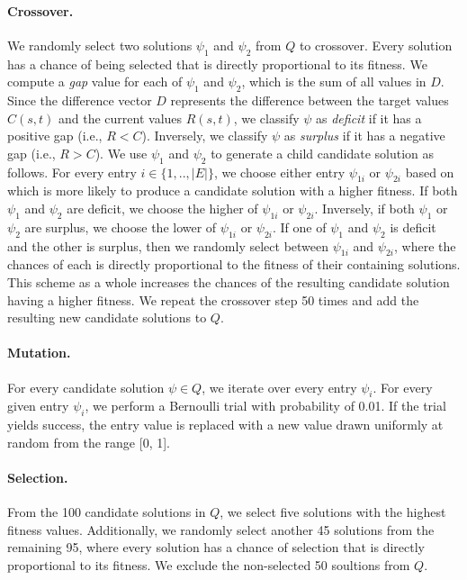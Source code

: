 \documentclass[runningheads,a4paper]{llncs}
\begin{document}
\paragraph{\textbf{Crossover.}} We randomly select two solutions $\psi_1$ and
$\psi_2$ from $Q$ to crossover. Every solution has a chance of being selected that is
directly proportional to its fitness. We compute a \emph{gap} value for each of
$\psi_1$ and $\psi_2$, which is the sum of all values in $D$. Since the
difference vector $D$ represents the difference between the target values $C(s,
t)$ and the current values $R(s, t)$, we classify $\psi$ as \emph{deficit} if
it has a positive gap (i.e., $R < C$). Inversely, we classify $\psi$ as
\emph{surplus} if it has a negative gap (i.e., $R > C$). We use $\psi_1$ and
$\psi_2$ to generate a child candidate solution as follows. For every entry $i
\in \{1, .., |E|\}$, we choose either entry $\psi_{1i}$ or $\psi_{2i}$ based on
which is more likely to produce a candidate solution with a higher fitness. If
both $\psi_1$ and $\psi_2$ are deficit, we choose the higher of $\psi_{1i}$ or
$\psi_{2i}$. Inversely, if both $\psi_1$ or $\psi_2$ are surplus, we choose the
lower of $\psi_{1i}$ or $\psi_{2i}$. If one of $\psi_1$ and $\psi_2$ is deficit
and the other is surplus, then we randomly select between $\psi_{1i}$ and
$\psi_{2i}$, where the chances of each is directly proportional to the fitness
of their containing solutions. This scheme as a whole increases the chances of
the resulting candidate solution having a higher fitness. We repeat the
crossover step 50 times and add the resulting new candidate solutions to $Q$.

\paragraph{\textbf{Mutation.}} For every candidate solution $\psi \in Q$, we
iterate over every entry $\psi_i$. For every given entry $\psi_i$, we perform a
Bernoulli trial with probability of 0.01. If the trial yields success, the
entry value is replaced with a new value drawn uniformly at random from the
range [0, 1].

\paragraph{\textbf{Selection.}} From the 100 candidate solutions in $Q$, we
select five solutions with the highest fitness values. Additionally, we randomly select
another 45 solutions from the remaining 95, where every solution has a chance
of selection that is directly proportional to its fitness. We exclude the
non-selected 50 soultions from $Q$.
\end{document}
